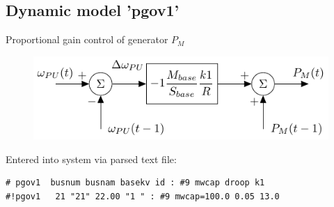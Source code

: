 \documentclass[14pt, unknownkeysallowed]{beamer}
\begin{document}
\subsection{Dynamic model 'pgov1'}
\begin{frame}[fragile]
Proportional gain control of generator $P_M$ 
\begin{figure}
	\includegraphics[width=\linewidth]{pgov1}
\end{figure}
Entered into system via parsed text file:
\begin{lstlisting}[basicstyle=\footnotesize]
# pgov1  busnum busnam basekv id : #9 mwcap droop k1
#!pgov1   21 "21" 22.00 "1 " : #9 mwcap=100.0 0.05 13.0
\end{lstlisting}
\end{frame}

\end{document}
